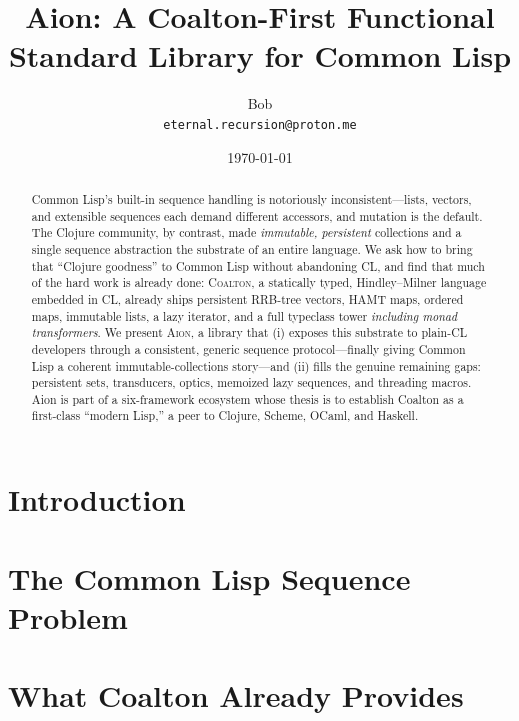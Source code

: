 \documentclass[11pt,a4paper]{article}
\title{\textbf{Aion}: A Coalton-First Functional\\ Standard Library for Common Lisp}
\author{Bob\\ \small\texttt{eternal.recursion@proton.me}}
\date{\today}
\begin{document}
\maketitle

\begin{abstract}
Common Lisp's built-in sequence handling is notoriously inconsistent---lists,
vectors, and extensible sequences each demand different accessors, and mutation is
the default. The Clojure community, by contrast, made \emph{immutable, persistent}
collections and a single sequence abstraction the substrate of an entire language.
We ask how to bring that ``Clojure goodness'' to Common Lisp without abandoning
CL, and find that much of the hard work is already done: \textsc{Coalton}, a
statically typed, Hindley--Milner language embedded in CL, already ships persistent
RRB-tree vectors, HAMT maps, ordered maps, immutable lists, a lazy iterator, and a
full typeclass tower \emph{including monad transformers}. We present \textsc{Aion},
a library that (i) exposes this substrate to plain-CL developers through a
consistent, generic sequence protocol---finally giving Common Lisp a coherent
immutable-collections story---and (ii) fills the genuine remaining gaps: persistent
sets, transducers, optics, memoized lazy sequences, and threading macros. Aion is part of a six-framework ecosystem whose thesis is to
establish Coalton as a first-class ``modern Lisp,'' a peer to Clojure, Scheme,
OCaml, and Haskell.
\end{abstract}

\section{Introduction}
\label{sec:intro}

\section{The Common Lisp Sequence Problem}
\label{sec:problem}

\section{What Coalton Already Provides}
\label{sec:coalton}
\end{document}
